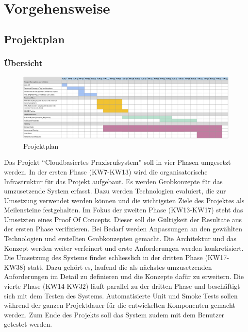 \section{Vorgehensweise}\label{sec:vorgehensweise}

\subsection{Projektplan}\label{subsec:projektplan}

\subsubsection*{Übersicht}
\begin{figure}[h]
    \label{fig:projectPlan}
    \includegraphics[width=\linewidth]{graphics/Projectplanning}\caption[Projektplan]{Projektplan}
\end{figure}

Das Projekt ``Cloudbasiertes Praxisrufsystem'' soll in vier Phasen umgesetzt werden.
In der ersten Phase (KW7-KW13) wird die organisatorische Infrastruktur für das Projekt aufgebaut.
Es werden Grobkonzepte für das umzusetzende System erfasst.
Dazu werden Technologien evaluiert, die zur Umsetzung verwendet werden können und
die wichtigsten Ziele des Projektes als Meilensteine festgehalten.
Im Fokus der zweiten Phase (KW13-KW17) steht das Umsetzten eines Proof Of Concepts.
Dieser soll die Gültigkeit der Resultate aus der ersten Phase verifizieren.
Bei Bedarf werden Anpassungen an den gewählten Technologien und erstellten Grobkonzepten gemacht.
Die Architektur und das Konzept werden weiter verfeinert und erste Anforderungen werden konkretisiert.
Die Umsetzung des Systems findet schliesslich in der dritten Phase (KW17-KW38) statt.
Dazu gehört es, laufend die als nächstes umzusetzenden Anforderungen im Detail zu definieren und die Konzepte dafür zu erweitern.
Die vierte Phase (KW14-KW32) läuft parallel zu der dritten Phase und beschäftigt sich mit dem Testen des Systems.
Automatisierte Unit und Smoke Tests sollen während der ganzen Projektdauer für die entwickelten Komponenten gemacht werden.
Zum Ende des Projekts soll das System zudem mit dem Benutzer getestet werden.


